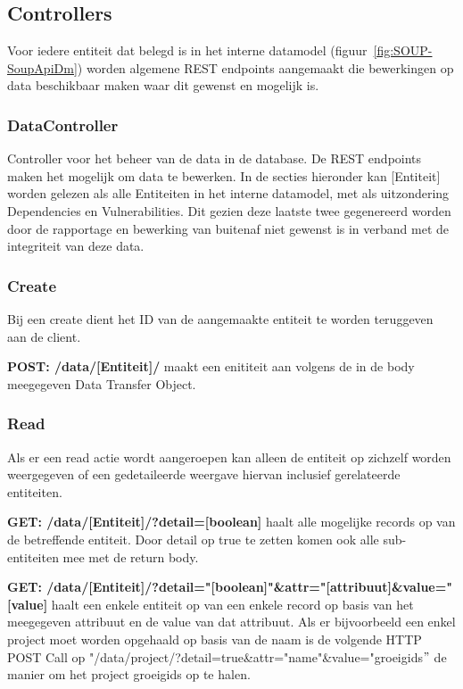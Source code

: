 \subsection{Controllers}\label{subsec:controllers}
Voor iedere entiteit dat belegd is in het interne datamodel (figuur~\ref{fig:SOUP-SoupApiDm}) worden algemene REST endpoints aangemaakt die bewerkingen op data beschikbaar maken waar dit gewenst en mogelijk is.
\subsubsection{DataController}
Controller voor het beheer van de data in de database. De REST endpoints maken het mogelijk om data te bewerken. In de secties hieronder kan [Entiteit] worden gelezen als alle Entiteiten in het interne datamodel, met als uitzondering Dependencies en Vulnerabilities. Dit gezien deze laatste twee gegenereerd worden door de rapportage en bewerking van buitenaf niet gewenst is in verband met de integriteit van deze data.
\subsubsection*{Create}
Bij een create dient het ID van de aangemaakte entiteit te worden teruggeven aan de client.

\textbf{POST: /data/[Entiteit]/} maakt een enititeit aan volgens de in de body meegegeven Data Transfer Object.

\subsubsection*{Read}
Als er een read actie wordt aangeroepen kan alleen de entiteit op zichzelf worden weergegeven of een gedetaileerde weergave hiervan inclusief gerelateerde entiteiten.

\textbf{GET: /data/[Entiteit]/?detail=[boolean]} haalt alle mogelijke records op van de betreffende entiteit. Door detail op true te zetten komen ook alle sub-entiteiten mee met de return body.

\textbf{GET: /data/[Entiteit]/?detail="[boolean]"\&attr="[attribuut]\&value="[value]} haalt een enkele entiteit op van een enkele record op basis van het meegegeven attribuut en de value van dat attribuut. Als er bijvoorbeeld een enkel project moet worden opgehaald op basis van de naam is de volgende HTTP POST Call op "/data/project/?detail=true\&attr="name"\&value="groeigids$"$ de manier om het project groeigids op te halen.

